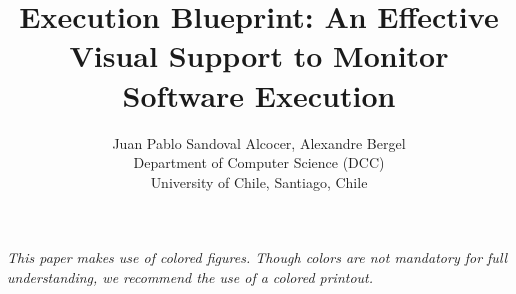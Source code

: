 \documentclass{sig-alternate}
\newcommand{\Title}{Execution Blueprint: An Effective Visual Support to Monitor Software Execution}
\newcommand{\TitleShort}{\Title}
\newcommand{\Authors}{Juan Pablo Sandoval Alcocer, Alexandre Bergel}
\newcommand{\AuthorsShort}{J.P. Sandoval Alcocer, A. Bergel}
\begin{document}
\title{\Title}

\author{\Authors\\[3mm]
Department of Computer Science (DCC)\\ University of Chile, Santiago, Chile\\[1 ex]
} 

\maketitle

\emph{This paper makes use of colored figures. Though colors are not mandatory for full understanding, we recommend  the use of a colored printout.}

\end{document}
